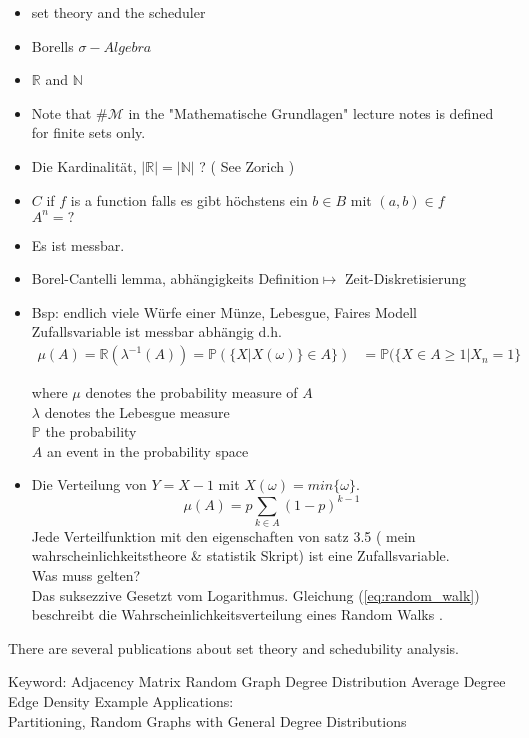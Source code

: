  \begin{itemize}
	\item set theory and the scheduler	      
 	\item Borells $\sigma-Algebra$
 	\item $\mathbb{R}$ and $\mathbb{N}$
 	\item Note that $\# \mathcal{M}$ in the "Mathematische Grundlagen" lecture notes \cite[]{} is defined for finite sets only.  
	 \item Die Kardinalität, $|\mathbb{R}| = |\mathbb{N}|$ ? ( See Zorich )
 	 \item $C$ if $f$ is a function  falls es gibt höchstens ein $b\in B$ mit $(a,b)\in f$\\
 		 $A^n = ?$
 	\item Es ist messbar.
 \item   Borel-Cantelli lemma, abhängigkeits Definition$\mapsto$ Zeit-Diskretisierung
 \item Bsp: endlich viele Würfe einer Münze, Lebesgue, Faires Modell\\
 		Zufallsvariable ist messbar abhängig d.h. 
 		\begin{align}
 			\mu(A) = \mathbb{R}(\lambda^{-1}(A)) = \mathbb{P} (\{ X| X(\omega)\} \in A \})
 				 & = \mathbb{P}(\{ X \in A \geq 1| X_n = 1 \} 
 		\end{align}  
 		
 		where $\mu$ denotes the probability measure of $A$\\
 		$\lambda$ denotes the Lebesgue measure\\
 		$\mathbb{P}$ the probability\\
 		$A$ an event in the probability space\\
 	
 					
 \item Die Verteilung von $Y = X-1$ mit $X(\omega) = min \{ \omega \}$.
       \begin{equation}\label{eq:random_walk}
       	\mu(A)= p \sum_{k \in A } (1-p) ^{k-1}    	
       	\end{equation}
 		Jede Verteilfunktion mit den eigenschaften von satz 3.5 ( mein wahrscheinlichkeitstheore \& statistik Skript) ist eine Zufallsvariable.\\
 		Was muss gelten?\\
 		Das suksezzive Gesetzt vom Logarithmus.   
   		Gleichung (\ref{eq:random_walk}) beschreibt die Wahrscheinlichkeitsverteilung eines Random Walks . 
 \end{itemize}
 
 
   There are several publications about set theory and schedubility analysis.\par   
   Keyword: Adjacency Matrix Random Graph Degree Distribution Average Degree Edge Density
   Example Applications:\\
   Partitioning, Random Graphs with General Degree Distributions
 		
